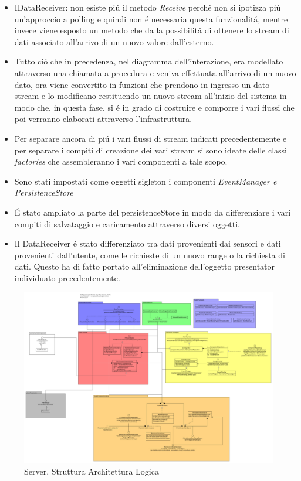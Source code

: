 \begin{itemize}
\item IDataReceiver: non esiste pi\'u il metodo \textit{Receive} perch\'e non si ipotizza pi\'u un'approccio a polling e quindi non \'e necessaria questa funzionalit\'a, mentre invece viene esposto un metodo che da la possibilit\'a di ottenere lo stream di dati associato all'arrivo di un nuovo valore dall'esterno.
\item Tutto ci\'o che in precedenza, nel diagramma dell'interazione, era modellato attraverso una chiamata a procedura e veniva effettuata all'arrivo di un nuovo dato, ora viene convertito in funzioni che prendono in ingresso un dato stream e lo modificano restituendo un nuovo stream all'inizio del sistema in modo che, in questa fase, si \'e in grado di costruire e comporre i vari flussi che poi verranno elaborati attraverso l'infrastruttura.
\item Per separare ancora di pi\'u i vari flussi di stream indicati precedentemente e per separare i compiti di creazione dei vari stream si sono ideate delle classi \textit{factories} che assembleranno i vari componenti a tale scopo.
\item Sono stati impostati come oggetti sigleton i componenti \textit{EventManager e PersistenceStore}
\item \'E stato ampliato la parte del persistenceStore in modo da differenziare i vari compiti di salvataggio e caricamento attraverso diversi oggetti.
\item Il DataReceiver \'e stato differenziato tra dati provenienti dai sensori e dati provenienti dall'utente, come le richieste di un nuovo range o la richiesta di dati. Questo ha di fatto portato all'eliminazione dell'oggetto presentator individuato precedentemente.
\end{itemize}

\begin{figure}
\centering
\includegraphics[width=\textwidth]{Figures/LogicArchitecture/Server/Structure}
\caption{Server, Struttura Architettura Logica}
\end{figure}

